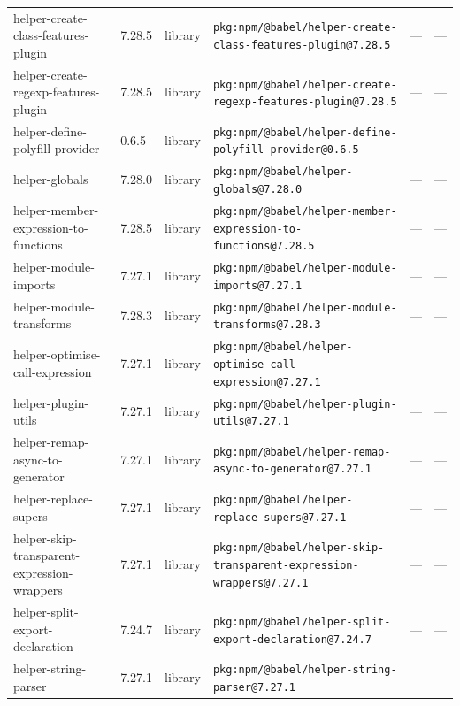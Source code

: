 \documentclass[11pt,a4paper]{article}
\begin{document}
\begin{longtable}{|p{4cm}|p{2cm}|p{1.6cm}|p{5cm}|p{1.5cm}|p{3.5cm}|}
\raggedright helper-create-class-features-plugin & 7.28.5 & library & \small\texttt{pkg:npm/@babel/helper-create-class-features-plugin@7.28.5} & — & \small — \\
\raggedright helper-create-regexp-features-plugin & 7.28.5 & library & \small\texttt{pkg:npm/@babel/helper-create-regexp-features-plugin@7.28.5} & — & \small — \\
\raggedright helper-define-polyfill-provider & 0.6.5 & library & \small\texttt{pkg:npm/@babel/helper-define-polyfill-provider@0.6.5} & — & \small — \\
\raggedright helper-globals & 7.28.0 & library & \small\texttt{pkg:npm/@babel/helper-globals@7.28.0} & — & \small — \\
\raggedright helper-member-expression-to-functions & 7.28.5 & library & \small\texttt{pkg:npm/@babel/helper-member-expression-to-functions@7.28.5} & — & \small — \\
\raggedright helper-module-imports & 7.27.1 & library & \small\texttt{pkg:npm/@babel/helper-module-imports@7.27.1} & — & \small — \\
\raggedright helper-module-transforms & 7.28.3 & library & \small\texttt{pkg:npm/@babel/helper-module-transforms@7.28.3} & — & \small — \\
\raggedright helper-optimise-call-expression & 7.27.1 & library & \small\texttt{pkg:npm/@babel/helper-optimise-call-expression@7.27.1} & — & \small — \\
\raggedright helper-plugin-utils & 7.27.1 & library & \small\texttt{pkg:npm/@babel/helper-plugin-utils@7.27.1} & — & \small — \\
\raggedright helper-remap-async-to-generator & 7.27.1 & library & \small\texttt{pkg:npm/@babel/helper-remap-async-to-generator@7.27.1} & — & \small — \\
\raggedright helper-replace-supers & 7.27.1 & library & \small\texttt{pkg:npm/@babel/helper-replace-supers@7.27.1} & — & \small — \\
\raggedright helper-skip-transparent-expression-wrappers & 7.27.1 & library & \small\texttt{pkg:npm/@babel/helper-skip-transparent-expression-wrappers@7.27.1} & — & \small — \\
\raggedright helper-split-export-declaration & 7.24.7 & library & \small\texttt{pkg:npm/@babel/helper-split-export-declaration@7.24.7} & — & \small — \\
\raggedright helper-string-parser & 7.27.1 & library & \small\texttt{pkg:npm/@babel/helper-string-parser@7.27.1} & — & \small — \\

\end{longtable}
\end{document}
